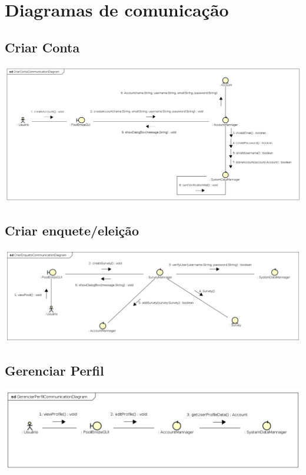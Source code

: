 \documentclass[a4paper,12pt]{report}
\begin{document}
\section*{Diagramas de comunicação}
\markright{}

\subsection*{Criar Conta}
\markright{}
\includegraphics[width=14.3cm]{communication_diagrams/CriarContaCommunicationDiagram.png}

\subsection*{Criar enquete/eleição}
\markright{}
\includegraphics[width=14.3cm]{communication_diagrams/CriarEnqueteCommunicationDiagram.png}

\subsection*{Gerenciar Perfil}
\markright{}
\includegraphics[width=14.3cm]{communication_diagrams/GerenciarPerfilCommunicationDiagram.png}
\end{document}
